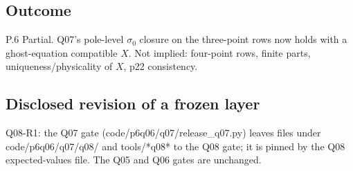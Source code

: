 \subsection*{Outcome}
P.6 Partial. Q07's pole-level $\sigma_0$ closure on the three-point rows now holds with a ghost-equation compatible
$X$. Not implied: four-point rows, finite parts, uniqueness/physicality of $X$, p22 consistency.
\subsection*{Disclosed revision of a frozen layer}
Q08-R1: the Q07 gate (code/p6q06/q07/release\_q07.py) leaves files under code/p6q06/q07/q08/ and tools/*q08* to the
Q08 gate; it is pinned by the Q08 expected-values file. The Q05 and Q06 gates are unchanged.
